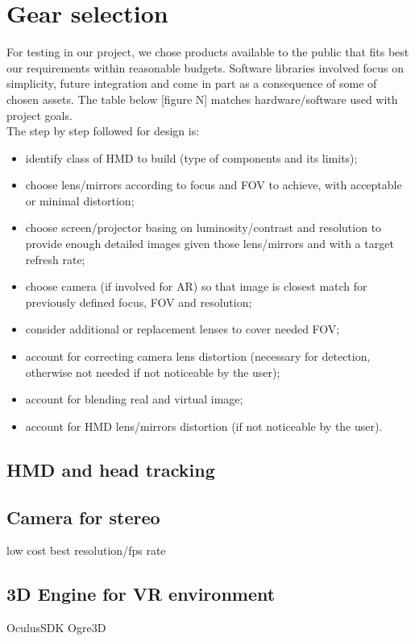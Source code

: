 


\section{Gear selection}
For testing in our project, we chose products available to the public that fits best our requirements within reasonable budgets. Software libraries involved focus on simplicity, future integration and come in part as a consequence of some of chosen assets. The table below [figure N] matches hardware/software used with project goals.\\
The step by step followed for design is:
\begin{itemize}
\item identify class of HMD to build (type of components and its limits);
\item choose lens/mirrors according to focus and FOV to achieve, with acceptable or minimal distortion;
\item choose screen/projector basing on luminosity/contrast and resolution to provide enough detailed images given those lens/mirrors and with a target refresh rate;
\item choose camera (if involved for AR) so that image is closest match for previously defined focus, FOV and resolution;
\item consider additional or replacement lenses to cover needed FOV;
\item account for correcting camera lens distortion (necessary for detection, otherwise not needed if not noticeable by the user);
\item account for blending real and virtual image;
\item account for HMD lens/mirrors distortion (if not noticeable by the user).
\end{itemize}

\iffalse
\subsection{HMD and head tracking}

\subsection{Camera for stereo}
low cost
best resolution/fps rate

\subsection{3D Engine for VR environment}
OculusSDK
Ogre3D

